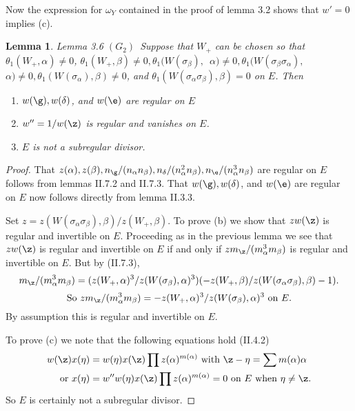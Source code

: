 \documentclass{memo-l}
\newtheorem{lemma}[theorem]{Lemma}
\theoremstyle{definition}
\theoremstyle{remark}
\numberwithin{section}{chapter}
\numberwithin{equation}{chapter}
\begin{document}
   Now the expression for ${\omega}_{Y}$ contained in the proof of lemma 3.2
shows that $w' = 0$ implies (c).


{\medskip}

\begin{lemma}{Lemma 3.6}   $(G_{2})$\  Suppose that $W_{+}$ can be chosen so that
${\theta}_{1}(W_{+},{\alpha})\ne 0$, ${\theta}_{1}(W_{+},{\beta})\ne 0,
{\theta}_{1}(W({\sigma}_{\beta}),$\ ${\alpha})\ne 0, {\theta}_{1}
(W({\sigma}_{\beta}{\sigma}_{\alpha}),$\ ${\alpha})\ne 0,
{\theta}_{1}(W({\sigma}_{\alpha}),{\beta})\ne 0$, and
${\theta}_{1}(W({\sigma}_{\alpha}{\sigma}_{\beta}),{\beta}) = 0$ on $E$.
 Then

\noindent
\begin{enumerate}[label=\alph*)]
\item $w({\g}), w({\delta})$, and $w({\e})$ are regular on $E$
\item $w'' = 1/w({\z})$ is regular and vanishes on $E$.
\item $E$ is not a subregular divisor.
\end{enumerate}
\end{lemma}

\medskip

\begin{proof}    That $z({\alpha}), z({\beta}), n_{{\g}}/(n_{\alpha}
n_{\beta}), n_{{\delta}}/(n_{\alpha}^{2}n_{\beta}),
n_{{\e}}/(n_{\alpha}^{3}n_{\beta})$ are regular on $E$ follows
from lemmas II.7.2 and II.7.3.
 That $w({\g}), w({\delta})$, and $w({\e})$ are regular on $E$ now
follows directly from lemma II.3.3.


   Set $z = z(W({\sigma}_{\alpha}{\sigma}_{\beta}),{\beta})/z(W_{+},{\beta})$.
 To prove (b) we show that $zw({\z})$ is regular and invertible on $E$.
 Proceeding as in the previous lemma we see that $zw({\z})$ is regular and
invertible on $E$ if and only if $zm_{{\z}}/(m_{\alpha}^{3}m_{\beta})$
is regular and invertible on $E$.
 But by (II.7.3),
$$
m_{{\z}}/(m_{\alpha}^{3}m_{\beta}) =
(z(W_{+},{\alpha})^{3}/z(W({\sigma}_{\beta}),{\alpha})^{3})
(-z(W_{+},{\beta})/z(W({\sigma}_{\alpha}{\sigma}_{\beta}),{\beta}) - 1).
$$
$$
{\text{So}}\ zm_{{\z}}/(m_{\alpha}^{3}m_{\beta}) =
-z(W_{+},{\alpha})^{3}/z(W({\sigma}_{\beta}),{\alpha})^{3}\
{\text{on}}\  E.
$$
By assumption this is regular and invertible on $E$.

   To prove (c) we note that the following equations hold (II.4.2)
$$
\aligned
w({\z})x({\eta}) &= w({\eta})x({\z}) \prod
z({\alpha})^{m({\alpha})}\  {\text{with}}\  {\z}-{\eta} =
\sum m({\alpha}){\alpha} \\
{\text{or}}\  x({\eta}) &= w''w({\eta})x({\z}) \prod
z({\alpha})^{m({\alpha})} = 0\ {\text{on}}\ E\ {\text{when}}\ {\eta}\ne {\z}.
\endaligned
$$
So $E$ is certainly not a subregular divisor.
\end{proof}
\end{document}

